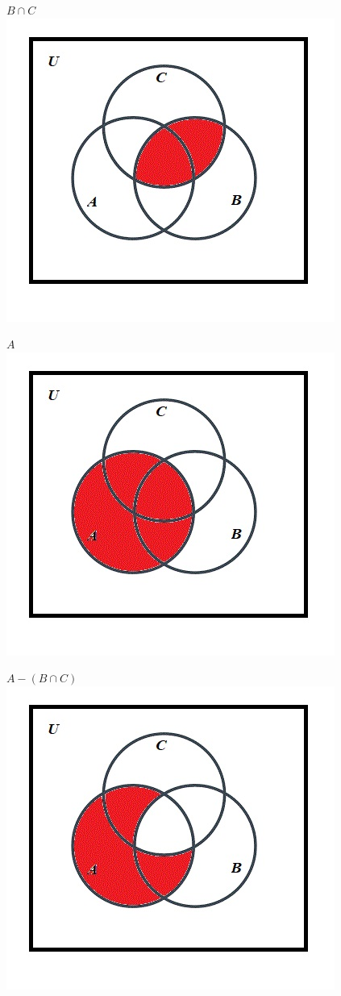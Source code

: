 \documentclass[10pt]{article}
\begin{document}
$B \cap C$\\
\includegraphics[scale=0.55]{21}

$A$\\
\includegraphics[scale=0.55]{12}

$A - (B \cap C)$\\
\includegraphics[scale=0.55]{22}
\end{document}
